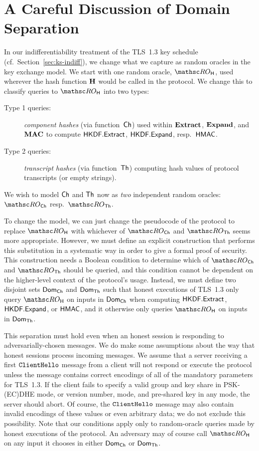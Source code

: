 \section{A Careful Discussion of Domain Separation}
\label{app:domsep}

In our indifferentiability treatment of the TLS~1.3 key schedule (cf.\ Section~\ref{sec:ks-indiff}), we change what we capture as random oracles in the key exchange model.
We start with one random oracle, $\ROhash$, used wherever the hash function $\mathbf{H}$ would be called in the protocol.
We change this to classify queries to $\ROhash$ into two types:
\begin{description}
	\item[Type 1 queries:]
	\emph{component hashes} (via function~$\mathsf{Ch}$) used within $\mathbf{Extract}$, $\mathbf{Expand}$, and $\mathbf{MAC}$ to compute $\mathsf{HKDF.Extract}$, $\mathsf{HKDF.Expand}$, resp.\ $\mathsf{HMAC}$.
	
	\medskip
	
	\item[Type 2 queries:]
	\emph{transcript hashes} (via function~$\mathsf{Th}$) computing hash values of protocol transcripts (or empty strings).
\end{description}
We wish to model $\mathsf{Ch}$ and $\mathsf{Th}$ now as \emph{two} independent random oracles: $\ROchash$ resp.\ $\ROthash$.

To change the model, we can just change the pseudocode of the protocol to replace $\ROhash$ with whichever of $\ROchash$ and $\ROthash$ seems more appropriate. 
However, we must define an explicit construction that performs this substitution in a systematic way in order to give a formal proof of security.
This construction needs a Boolean condition to determine which of $\ROchash$ and $\ROthash$ should be queried, and this condition cannot be dependent on the higher-level context of the protocol's usage. 
Instead, we must define two disjoint sets $\mathsf{Dom}_{\mathsf{Ch}}$ and $\mathsf{Dom}_{\mathsf{Th}}$ such that honest executions of TLS~1.3 only query $\ROhash$ on inputs in $\mathsf{Dom}_{\mathsf{Ch}}$ when computing $\mathsf{HKDF.Extract}$, $\mathsf{HKDF.Expand}$, or $\mathsf{HMAC}$, and it otherwise only queries $\ROhash$ on inputs in $\mathsf{Dom}_{\mathsf{Th}}$.


This separation must hold even when an honest session is responding to adversarially-chosen messages.
We do make some assumptions about the way that honest sessions process incoming messages. 
We assume that a server receiving a first $\mathtt{ClientHello}$ message from a client will not respond or execute the protocol unless the message contains correct encodings of all of the mandatory parameters for TLS~1.3. 
If the client fails to specify a valid group and key share in PSK-(EC)DHE mode, or version number, mode, and pre-shared key in any mode, the server should abort.
Of course, the $\mathtt{ClientHello}$ message may also contain invalid encodings of these values or even arbitrary data; we do not exclude this possibility.
Note that our conditions apply only to random-oracle queries made by honest executions of the protocol. 
An adversary may of course call $\ROhash$ on any input it chooses in either $\mathsf{Dom}_{\mathsf{Ch}}$ or $\mathsf{Dom}_{\mathsf{Th}}$.

